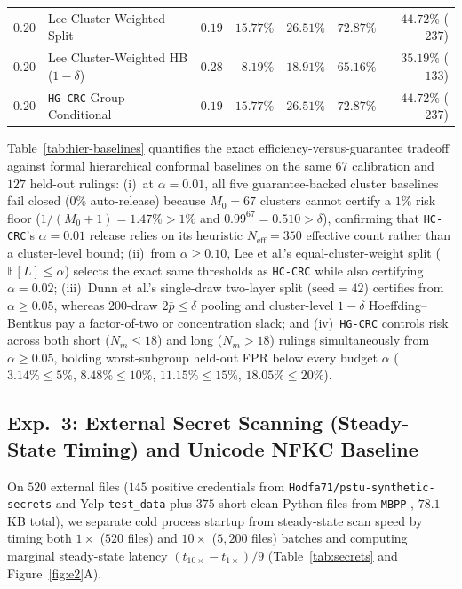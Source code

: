 \documentclass{article}
\begin{document}
\begin{table}[t]
\begin{center}
{\begin{tabular}{llrrrrr}
$0.20$ & Lee Cluster-Weighted Split & $0.19$ & $15.77\%$ & $26.51\%$ & $72.87\%$ & $44.72\%$ ($237$) \\
$0.20$ & Lee Cluster-Weighted HB ($1{-}\delta$) & $0.28$ & $8.19\%$ & $18.91\%$ & $65.16\%$ & $35.19\%$ ($133$) \\
$0.20$ & \texttt{HG-CRC} Group-Conditional & $0.19$ & $15.77\%$ & $26.51\%$ & $72.87\%$ & $44.72\%$ ($237$) \\
\bottomrule
\end{tabular}%
}
\end{center}
\vskip -0.14in
\end{table}

Table~\ref{tab:hier-baselines} quantifies the exact efficiency-versus-guarantee tradeoff against formal hierarchical conformal baselines on the same $67$ calibration and $127$ held-out rulings: (i)~at $\alpha{=}0.01$, all five guarantee-backed cluster baselines fail closed ($0\%$ auto-release) because $M_0{=}67$ clusters cannot certify a $1\%$ risk floor ($1/(M_0{+}1){=}1.47\% > 1\%$ and $0.99^{67}{=}0.510 > \delta$), confirming that \texttt{HC-CRC}'s $\alpha{=}0.01$ release relies on its heuristic $N_{\text{eff}}{=}350$ effective count rather than a cluster-level bound; (ii)~from $\alpha \ge 0.10$, Lee et al.'s equal-cluster-weight split ($\mathbb{E}[L] \le \alpha$) selects the exact same thresholds as \texttt{HC-CRC} while also certifying $\alpha{=}0.02$; (iii)~Dunn et al.'s single-draw two-layer split ($\text{seed}{=}42$) certifies from $\alpha \ge 0.05$, whereas $200$-draw $2\bar{p} \le \delta$ pooling and cluster-level $1{-}\delta$ Hoeffding--Bentkus pay a factor-of-two or concentration slack; and (iv)~\texttt{HG-CRC} controls risk across both short ($N_m \le 18$) and long ($N_m > 18$) rulings simultaneously from $\alpha \ge 0.05$, holding worst-subgroup held-out FPR below every budget $\alpha$ ($3.14\% \le 5\%$, $8.48\% \le 10\%$, $11.15\% \le 15\%$, $18.05\% \le 20\%$).

\subsection{Exp.~3: External Secret Scanning (Steady-State Timing) and Unicode NFKC Baseline}
\label{sec:exp3}

On $520$ external files ($145$ positive credentials from \texttt{Hodfa71/pstu-synthetic-secrets} and Yelp \texttt{test\_data} plus $375$ short clean Python files from \texttt{MBPP} \citep{austin2021mbpp}, $78.1$\,KB total), we separate cold process startup from steady-state scan speed by timing both $1\times$ ($520$ files) and $10\times$ ($5{,}200$ files) batches and computing marginal steady-state latency $(t_{10\times} - t_{1\times})/9$ (Table~\ref{tab:secrets} and Figure~\ref{fig:e2}A).
\end{document}
